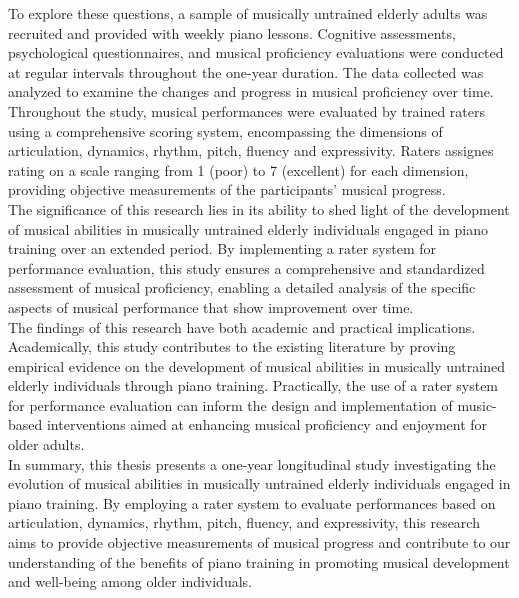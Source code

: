 To explore these questions, a sample of musically untrained elderly adults was recruited and provided with weekly piano lessons. Cognitive assessments, psychological questionnaires, and musical proficiency evaluations were conducted at regular intervals throughout the one-year duration. The data collected was analyzed to examine the changes and progress in musical proficiency over time. Throughout the study, musical performances were evaluated by trained raters using a comprehensive scoring system, encompassing the dimensions of articulation, dynamics, rhythm, pitch, fluency and expressivity. Raters assignes rating on a scale ranging from 1 (poor) to 7 (excellent) for each dimension, providing objective measurements of the participants' musical progress.\\
The significance of this research lies in its ability to shed light of the development of musical abilities in musically untrained elderly individuals engaged in piano training over an extended period. By implementing a rater system for performance evaluation, this study ensures a comprehensive and standardized assessment of musical proficiency, enabling a detailed analysis of the specific aspects of musical performance that show improvement over time.\\
The findings of this research have both academic and practical implications. Academically, this study contributes to the existing literature by proving empirical evidence on the development of musical abilities in musically untrained elderly individuals through piano training. Practically, the use of a rater system for performance evaluation can inform the design and implementation of music-based interventions aimed at enhancing musical proficiency and enjoyment for older adults.\\
In summary, this thesis presents a one-year longitudinal study investigating the evolution of musical abilities in musically untrained elderly individuals engaged in piano training. By employing a rater system to evaluate performances based on articulation, dynamics, rhythm, pitch, fluency, and expressivity, this research aims to provide objective measurements of musical progress and contribute to our understanding of the benefits of piano training in promoting musical development and well-being among older individuals. \\

